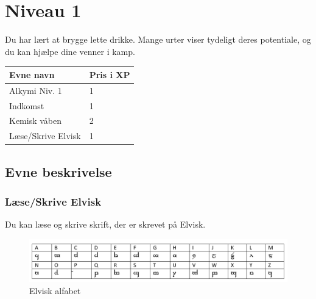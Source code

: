 \chapter*{Niveau 1}
Du har lært at brygge lette drikke. Mange urter viser tydeligt deres potentiale, og du kan hjælpe dine venner i kamp.
\begin{table}[H]
    \centering
    \begin{tabular}{|p{}|p{}|}
    \rowcolor{cerulean!80}\hline
        Evne navn & Pris i XP \\\hline
         Alkymi Niv. 1 & 1 \\\hline
         Indkomst & 1 \\\hline
         Kemisk våben & 2 \\\hline
         Læse/Skrive Elvisk & 1\\
         \hline
    \end{tabular}
\end{table}

\section*{Evne beskrivelse}







\subsection*{Læse/Skrive Elvisk}
Du kan læse og skrive skrift, der er skrevet på Elvisk.\\
\begin{figure}[H]
    \centering
    \includegraphics[width=1\textwidth]{setup/Alfabeter/Elvisk alfabet.pdf}
    \caption{Elvisk alfabet}
\end{figure}

